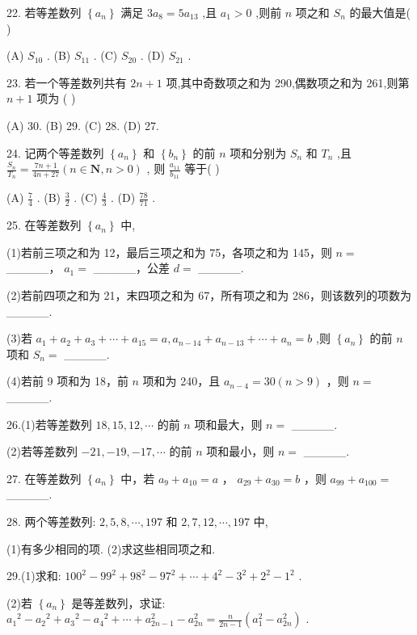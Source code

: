\documentclass[10pt]{article}
\begin{document}
22. 若等差数列 \(\left\{  {a}_{n}\right\}\) 满足 \(3{a}_{8} = 5{a}_{13}\) ,且 \({a}_{1} > 0\) ,则前 \(n\) 项之和 \({S}_{n}\) 的最大值是( )

(A) \({S}_{10}\) . (B) \({S}_{11}\) . (C) \({S}_{20}\) . (D) \({S}_{21}\) .

23. 若一个等差数列共有 \({2n} + 1\) 项,其中奇数项之和为 290,偶数项之和为 261,则第 \(n + 1\) 项为 ( )

(A) 30. (B) 29. (C) 28. (D) 27.

24. 记两个等差数列 \(\left\{  {a}_{n}\right\}\) 和 \(\left\{  {b}_{n}\right\}\) 的前 \(n\) 项和分别为 \({S}_{n}\) 和 \({T}_{n}\) ,且 \(\frac{{S}_{n}}{{T}_{n}} = \frac{{7n} + 1}{{4n} + {27}}\left( {n \in  \mathbf{N},n > 0}\right)\) , 则 \(\frac{{a}_{11}}{{b}_{11}}\) 等于( )

(A) \(\frac{7}{4}\) . (B) \(\frac{3}{2}\) . (C) \(\frac{4}{3}\) . (D) \(\frac{78}{71}\) .

25. 在等差数列 \(\left\{  {a}_{n}\right\}\) 中,

(1)若前三项之和为 12，最后三项之和为 75，各项之和为 145，则 \(n =\) \_\_\_\_\_， \({a}_{1} =\) \_\_\_\_\_，公差 \(d =\) \_\_\_\_\_.

(2)若前四项之和为 21，末四项之和为 67，所有项之和为 286，则该数列的项数为\_\_\_\_\_.

(3)若 \({a}_{1} + {a}_{2} + {a}_{3} + \cdots  + {a}_{15} = a,{a}_{n - {14}} + {a}_{n - {13}} + \cdots  + {a}_{n} = b\) ,则 \(\left\{  {a}_{n}\right\}\) 的前 \(n\) 项和 \({S}_{n} =\) \_\_\_\_\_.

(4)若前 9 项和为 18，前 \(n\) 项和为 240，且 \({a}_{n - 4} = {30}\left( {n > 9}\right)\) ，则 \(n =\) \_\_\_\_\_.

26.(1)若等差数列 \({18},{15},{12},\cdots\) 的前 \(n\) 项和最大，则 \(n =\) \_\_\_\_\_.

(2)若等差数列 \(- {21}, - {19}, - {17},\cdots\) 的前 \(n\) 项和最小，则 \(n =\) \_\_\_\_\_.

27. 在等差数列 \(\left\{  {a}_{n}\right\}\) 中，若 \({a}_{9} + {a}_{10} = a\) ， \({a}_{29} + {a}_{30} = b\) ，则 \({a}_{99} + {a}_{100} =\) \_\_\_\_\_.

28. 两个等差数列: \(2,5,8,\cdots ,{197}\) 和 \(2,7,{12},\cdots ,{197}\) 中,

(1)有多少相同的项. (2)求这些相同项之和.

29.(1)求和: \({100}^{2} - {99}^{2} + {98}^{2} - {97}^{2} + \cdots  + {4}^{2} - {3}^{2} + {2}^{2} - {1}^{2}\) .

(2)若 \(\left\{  {a}_{n}\right\}\) 是等差数列，求证: \({a}_{1}{}^{2} - {a}_{2}{}^{2} + {a}_{3}{}^{2} - {a}_{4}{}^{2} + \cdots  + {a}_{{2n} - 1}^{2} - {a}_{2n}^{2} = \frac{n}{{2n} - 1}\left( {{a}_{1}^{2} - {a}_{2n}^{2}}\right)\) .
\end{document}
